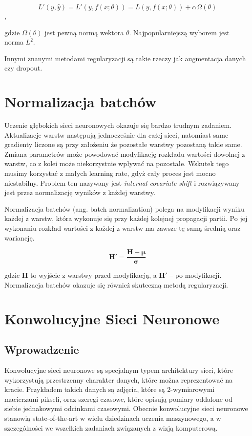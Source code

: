 \documentclass[licencjacka]{pracamgr}
\begin{document}
$$ L'(y, \hat{y}) = L'(y, f(x; \theta)) = L(y, f(x; \theta)) + \alpha \Omega(\theta) $$, 

gdzie $ \Omega(\theta) $ jest pewną normą wektora $ \theta $. Najpopularniejszą wyborem jest norma $ L^2 $.

Innymi znanymi metodami regularyzacji są takie rzeczy jak augmentacja danych czy dropout.

\section{Normalizacja batchów}

Uczenie głębokich sieci neuronowych okazuje się bardzo trudnym zadaniem. Aktualizacje warstw następują jednocześnie dla całej sieci, natomiast same gradienty liczone są przy założeniu że pozostałe warstwy pozostaną takie same. Zmiana parametrów może powodować modyfikację rozkładu wartości dowolnej z warstw, co z kolei może niekorzystnie wpływać na pozostałe. Wskutek tego musimy korzystać z małych learning rate, gdyż cały proces jest mocno niestabilny. Problem ten nazywany jest \emph{internal covariate shift} i rozwiązywany jest przez normalizację wyników z każdej warstwy. 

Normalizacja batchów (ang. batch normalization) \cite{batch-norm} polega na modyfikacji wyniku każdej z warstw, która wykonuje się przy każdej kolejnej propagacji partii. Po jej wykonaniu rozkład wartości z każdej z warstw ma zawsze tę samą średnią oraz wariancję.

$$ \mathbf{H'} = \frac{\mathbf{H} - \mathbf{\mu}}{\mathbf{\sigma}} $$

gdzie $ \mathbf{H} $ to wyjście z warstwy przed modyfikacją, a $ \mathbf{H'} $ -- po modyfikacji. Normalizacja batchów okazuje się również skuteczną metodą regularyzacji.

\section{Konwolucyjne Sieci Neuronowe}

\subsection{Wprowadzenie}

Konwolucyjne sieci neuronowe \cite{lecun-cnn, krizhevsky-cnn} są specjalnym typem architektury sieci, które wykorzystują przestrzenny charakter danych, które można reprezentować na kracie. Przykładem takich danych są zdjęcia, które są 2-wymiarowymi macierzami pikseli, oraz szeregi czasowe, które opisują pomiary oddalone od siebie jednakowymi odcinkami czasowymi. Obecnie konwolucyjne sieci neuronowe stanowią state-of-the-art w wielu dziedzinach uczenia maszynowego, a w szczególności we wszelkich zadaniach związanych z wizją komputerową. 
\end{document}
